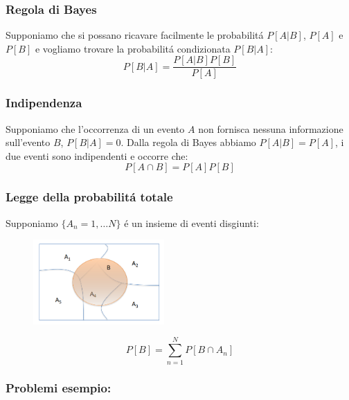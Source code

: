         \subsubsection{Regola di Bayes}\label{Regola di Bayes}
            Supponiamo che si possano ricavare facilmente le probabilitá $P[A|B]$, $P[A]$ e $P[B]$ e vogliamo trovare la probabilitá condizionata $P[B|A]$:
            \[
                P[B|A] = \frac{P[A|B]P[B]}{P[A]}   
            \]
        \subsubsection{Indipendenza}\label{Indipendenza}
            Supponiamo che l'occorrenza  di un evento $A$ non fornisca nessuna informazione sull'evento $B$, $P[B|A] = 0$. Dalla regola di Bayes abbiamo $P[A|B] = P[A]$,
            i due eventi sono indipendenti e occorre che:
            \[
                P[A\cap B] = P[A]P[B]    
            \]
        \subsubsection{Legge della probabilitá totale}\label{Legge della probabilitá totale}
            Supponiamo $\{ A_n = 1,\dots N\}$ é un insieme di eventi disgiunti:

            \begin{figure}[H]
                \centering
                \includegraphics[width = 5cm]{media/probabilita_totale.png}
            \end{figure}
            \[
                P[B] = \sum_{n=1}^{N}P[B\cap A_n]    
            \]
        \subsubsection{Problemi esempio:}
